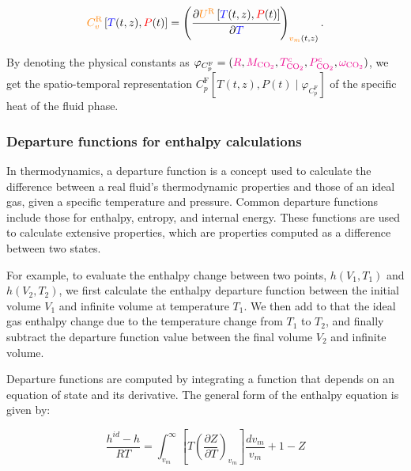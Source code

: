 \documentclass[../Article_Model_Parameters.tex]{subfiles}
\begin{document}
	{\footnotesize
	\begin{equation}
		{\color{orange}C_v^{\text{R}}}\left[{\color{blue}T}(t,z),{\color{red}P}(t)\right] = \left(\cfrac{\partial{\color{orange}U^{\text{R}}}\left[{\color{blue}T}(t,z),{\color{red}P}(t)\right]}{\partial {\color{blue}T}}\right)_{{\color{orange}v_m}(t,z)}. \label{eq: CvR}
	\end{equation} }
	
	By denoting the physical constants as $\varphi_{C_p^{\text{F}}} = ({\color{magenta}R}, {\color{magenta}M_{\text{CO}_2}},\\ {\color{magenta}T^c_{\text{CO}_2}}, {\color{magenta}P^c_{\text{CO}_2}}, {\color{magenta}\omega_{\text{CO}_2}})$, we get the spatio-temporal representation $C_p^{\text{F}}\left[T(t,z),P(t) \mid \varphi_{C_p^{\text{F}}}\right]$ of the specific heat of the fluid phase.
	
	\subsubsection{Departure functions for enthalpy calculations} \label{CH:Enthalpy}
	
	In thermodynamics, a departure function is a concept used to calculate the difference between a real fluid's thermodynamic properties and those of an ideal gas, given a specific temperature and pressure. Common departure functions include those for enthalpy, entropy, and internal energy. These functions are used to calculate extensive properties, which are properties computed as a difference between two states.
	
	For example, to evaluate the enthalpy change between two points, $h(V_1,T_1)$ and $h(V_2,T_2)$, we first calculate the enthalpy departure function between the initial volume $V_1$ and infinite volume at temperature $T_1$. We then add to that the ideal gas enthalpy change due to the temperature change from $T_1$ to $T_2$, and finally subtract the departure function value between the final volume $V_2$ and infinite volume.
	
	Departure functions are computed by integrating a function that depends on an equation of state and its derivative. The general form of the enthalpy equation is given by:
	
	{\footnotesize
		\begin{equation}
			\frac{h^{id}-h}{RT} =\int_{v_m}^{\infty }\left[T\left({\frac{\partial Z}{\partial T}}\right)_{v_m}\right]{\frac{dv_m}{v_m}} + 1-Z
		\end{equation}
	}
	
\end{document}
